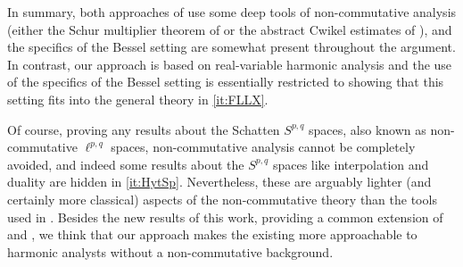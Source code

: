\documentclass[reqno]{amsart}
\theoremstyle{plain}
\theoremstyle{definition}
\theoremstyle{remark}
\begin{document}
In summary, both approaches of \cite{FLSZ} use some deep tools of non-commutative analysis (either the Schur multiplier theorem of \cite{CGPT} or the abstract Cwikel estimates of \cite{LSZ:20}), and the specifics of the Bessel setting are somewhat present throughout the argument. In contrast, our approach is based on real-variable harmonic analysis and the use of the specifics of the Bessel setting is essentially restricted to showing that this setting fits into the general theory in \eqref{it:FLLX}.

Of course, proving any results about the Schatten $S^{p,q}$ spaces, also known as non-commutative $\ell^{p,q}$ spaces, non-commutative analysis cannot be completely avoided, and indeed some results about the $S^{p,q}$ spaces like interpolation and duality are hidden in \eqref{it:HytSp}. Nevertheless, these are arguably lighter (and certainly more classical) aspects of the non-commutative theory than the tools used in \cite{FLSZ}. Besides the new results of this work, providing a common extension of \cite[Theorem 1.1]{Hyt:Sp} and \cite[Theorem 1.2]{FLSZ}, we think that our approach makes the existing \cite[Theorem 1.2]{FLSZ} more approachable to harmonic analysts without a non-commutative background.

%
%
\end{document}
